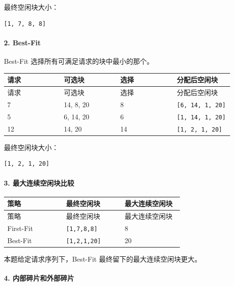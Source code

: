 \documentclass[UTF8]{ctexart}
\begin{document}
最终空闲块大小：

\begin{Verbatim}[fontsize=\small,breaklines=true]
[1, 7, 8, 8]
\end{Verbatim}

\paragraph*{2. Best-Fit}

Best-Fit 选择所有可满足请求的块中最小的那个。

\begin{longtable}{|p{0.23\linewidth}|p{0.23\linewidth}|p{0.23\linewidth}|p{0.23\linewidth}|}
\hline
请求 & 可选块 & 选择 & 分配后空闲块 \\
\hline
\endfirsthead
请求 & 可选块 & 选择 & 分配后空闲块 \\
\hline
\endhead
7 & 14, 8, 20 & 8 & \texttt{[6, 14, 1, 20]} \\
\hline
5 & 6, 14, 20 & 6 & \texttt{[1, 14, 1, 20]} \\
\hline
12 & 14, 20 & 14 & \texttt{[1, 2, 1, 20]} \\
\hline
\end{longtable}

最终空闲块大小：

\begin{Verbatim}[fontsize=\small,breaklines=true]
[1, 2, 1, 20]
\end{Verbatim}

\paragraph*{3. 最大连续空闲块比较}

\begin{longtable}{|p{0.31\linewidth}|p{0.31\linewidth}|p{0.31\linewidth}|}
\hline
策略 & 最终空闲块 & 最大连续空闲块 \\
\hline
\endfirsthead
策略 & 最终空闲块 & 最大连续空闲块 \\
\hline
\endhead
First-Fit & \texttt{[1,7,8,8]} & 8 \\
\hline
Best-Fit & \texttt{[1,2,1,20]} & 20 \\
\hline
\end{longtable}

本题给定请求序列下，Best-Fit 最终留下的最大连续空闲块更大。

\paragraph*{4. 内部碎片和外部碎片}
\end{document}
